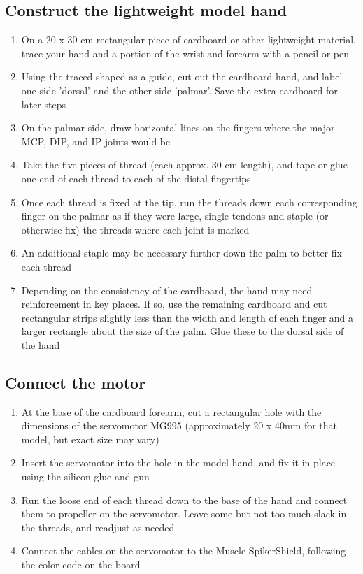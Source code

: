 \documentclass{article}
\begin{document}
\subsection{Construct the lightweight model hand}

\begin{enumerate}
\item On a 20 x 30 cm rectangular piece of cardboard or other lightweight material, trace your hand and a portion of the wrist and forearm with a pencil or pen
\item Using the traced shaped as a guide, cut out the cardboard hand, and label one side 'dorsal' and the other side 'palmar'. Save the extra cardboard for later steps
\item On the palmar side, draw horizontal lines on the fingers where the major MCP, DIP, and IP joints would be
\item Take the five pieces of thread (each approx. 30 cm length), and tape or glue one end of each thread to each of the distal fingertips
\item Once each thread is fixed at the tip, run the threads down each corresponding finger on the palmar as if they were large, single tendons and staple (or otherwise fix) the threads where each joint is marked
\item An additional staple may be necessary further down the palm to better fix each thread
\item Depending on the consistency of the cardboard, the hand may need reinforcement in key places. If so, use the remaining cardboard and cut rectangular strips slightly less than the width and length of each finger and a larger rectangle about the size of the palm. Glue these to the dorsal side of the hand
\end{enumerate}

\subsection{Connect the motor}

\begin{enumerate}
\item At the base of the cardboard forearm, cut a rectangular hole with the dimensions of the servomotor MG995 (approximately 20 x 40mm for that model, but exact size may vary)
\item Insert the servomotor into the hole in the model hand, and fix it in place using the silicon glue and gun
\item Run the loose end of each thread down to the base of the hand and connect them to propeller on the servomotor. Leave some but not too much slack in the threads, and readjust as needed
\item Connect the cables on the servomotor to the Muscle SpikerShield, following the color code on the board
\end{enumerate}
\end{document}
